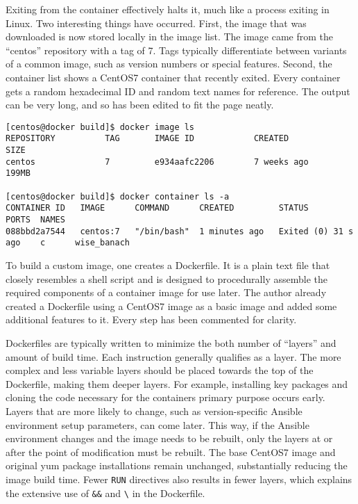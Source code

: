 Exiting from the container effectively halts it, much like a process exiting
in Linux. Two interesting things have occurred. First, the image that was
downloaded is now stored locally in the image list. The image came from the
``centos'' repository with a tag of 7. Tags typically differentiate between
variants of a common image, such as version numbers or special features.
Second, the container list shows a CentOS7 container that recently exited.
Every container gets a random hexadecimal ID and random text names for
reference. The output can be very long, and so has been edited to fit the page
neatly.
 
\begin{verbatim}
[centos@docker build]$ docker image ls
REPOSITORY          TAG       IMAGE ID            CREATED             SIZE
centos              7         e934aafc2206        7 weeks ago         199MB

[centos@docker build]$ docker container ls -a
CONTAINER ID   IMAGE      COMMAND      CREATED         STATUS                 PORTS  NAMES
088bbd2a7544   centos:7   "/bin/bash"  1 minutes ago   Exited (0) 31 s ago    c      wise_banach
\end{verbatim}

To build a custom image, one creates a Dockerfile. It is a plain text file
that closely resembles a shell script and is designed to procedurally assemble
the required components of a container image for use later. The author already
created a Dockerfile using a CentOS7 image as a basic image and added some
additional features to it. Every step has been commented for clarity.

Dockerfiles are typically written to minimize the both number of ``layers'' and
amount of build time. Each instruction generally qualifies as a layer. The
more complex and less variable layers should be placed towards the top of the
Dockerfile, making them deeper layers. For example, installing key packages
and cloning the code necessary for the containers primary purpose occurs
early. Layers that are more likely to change, such as version-specific Ansible
environment setup parameters, can come later. This way, if the Ansible
environment changes and the image needs to be rebuilt, only the layers at or
after the point of modification must be rebuilt. The base CentOS7 image and
original yum package installations remain unchanged, substantially reducing
the image build time. Fewer \verb|RUN| directives also results in fewer
layers, which explains the extensive use of \verb|&&| and \verb|\| in the
Dockerfile.

